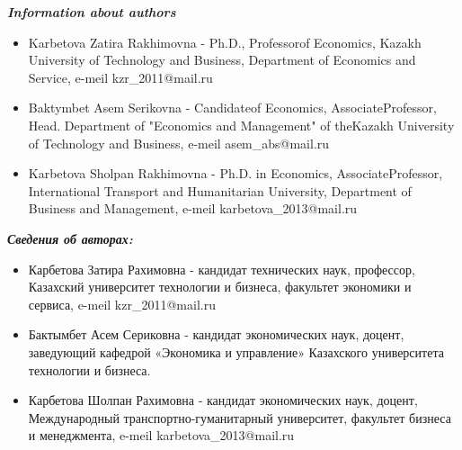 \emph{{\bfseries Information about authors}}

\begin{itemize}
\item
Karbetova Zatira Rakhimovna - Ph.D., Professorof Economics, Kazakh
University of Technology and Business, Department of Economics and
Service, e-meil kzr\_2011@mail.ru

\item
Baktymbet Asem Serikovna - Candidateof Economics, AssociateProfessor,
Head. Department of "Economics and Management" of theKazakh University
of Technology and Business, e-meil asem\_abs@mail.ru

\item
Karbetova Sholpan Rakhimovna - Ph.D. in Economics, AssociateProfessor,
International Transport and Humanitarian University, Department of
Business and Management, e-meil
karbetova\_2013@mail.ru
\end{itemize}

\emph{{\bfseries Сведения об авторах:}}

\begin{itemize}
\item
Карбетова Затира Рахимовна - кандидат технических наук, профессор,
Казахский университет технологии и бизнеса, факультет экономики и
сервиса, e-meil kzr\_2011@mail.ru

\item
Бактымбет Асем Сериковна - кандидат экономических наук, доцент,
заведующий кафедрой «Экономика и управление» Казахского университета
технологии и бизнеса.

\item
Карбетова Шолпан Рахимовна - кандидат экономических наук, доцент,
Международный транспортно-гуманитарный университет, факультет бизнеса и
менеджмента, e-meil karbetova\_2013@mail.ru
\end{itemize}
